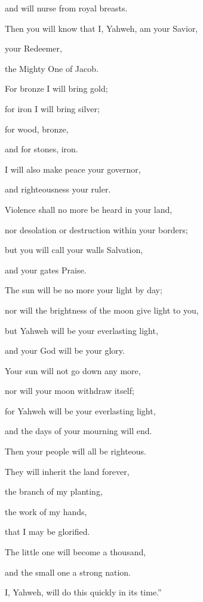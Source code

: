 {\par }{\QB and will nurse from royal breasts.
\par }{\Q Then you will know that I, Yahweh, am your Savior,
\par }{\QB your Redeemer,
\par }{\QB the Mighty One of Jacob.
\par }{\Q {}For bronze I will bring gold;
\par }{\QB for iron I will bring silver;
\par }{\QB for wood, bronze,
\par }{\QB and for stones, iron.
\par }{\Q I will also make peace your governor,
\par }{\QB and righteousness your ruler.
\par }{\Q {}Violence shall no more be heard in your land,
\par }{\QB nor desolation or destruction within your borders;
\par }{\Q but you will call your walls Salvation,
\par }{\QB and your gates Praise.
\par }{\Q {}The sun will be no more your light by day;
\par }{\QB nor will the brightness of the moon give light to you,
\par }{\Q but Yahweh will be your everlasting light,
\par }{\QB and your God will be your glory.
\par }{\Q {}Your sun will not go down any more,
\par }{\QB nor will your moon withdraw itself;
\par }{\Q for Yahweh will be your everlasting light,
\par }{\QB and the days of your mourning will end.
\par }{\Q {}Then your people will all be righteous.
\par }{\QB They will inherit the land forever,
\par }{\QB the branch of my planting,
\par }{\QB the work of my hands,
\par }{\QB that I may be glorified.
\par }{\Q {}The little one will become a thousand,
\par }{\QB and the small one a strong nation.
\par }{\QB I, Yahweh, will do this quickly in its time.”

}
